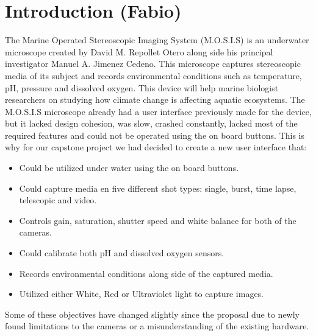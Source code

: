 \section{Introduction (Fabio)}
The Marine Operated Stereoscopic Imaging System (M.O.S.I.S) is an underwater microscope created by David M. Repollet Otero along side his principal investigator Manuel A. Jimenez Cedeno. This microscope captures stereoscopic media of its subject and records environmental conditions such as temperature, pH, pressure and dissolved oxygen. This device will help marine biologist researchers on studying how climate change is affecting aquatic ecosystems. The M.O.S.I.S microscope already had a user interface previously made for the device, but it lacked design cohesion, was slow, crashed constantly, lacked most of the required features and could not be operated using the on board buttons. This is why for our capstone project we had decided to create a new user interface that:
\begin{itemize}
	\item Could be utilized under water using the on board buttons.
	\item Could capture media en five different shot types: single, burst, time lapse, telescopic and video.
	\item Controls gain, saturation, shutter speed and white balance for both of the cameras.
	\item Could calibrate both pH and dissolved oxygen sensors.
	\item Records environmental conditions along side of the captured media.
	\item Utilized either White, Red or Ultraviolet light to capture images.
\end{itemize}
Some of these objectives have changed slightly since the proposal due to newly found limitations to the cameras or a misunderstanding of the existing hardware.\\
